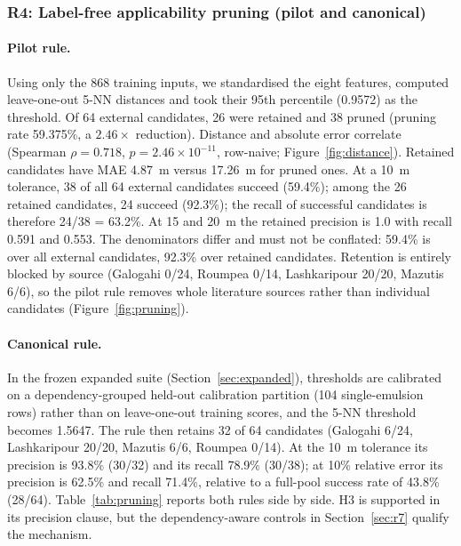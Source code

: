 \documentclass[11pt,a4paper]{article}
\newcommand{\um}{\textmu m}
\begin{document}
\subsubsection{R4: Label-free applicability pruning (pilot and canonical)}
\label{sec:r4}
\paragraph{Pilot rule.} Using only the 868 training inputs, we standardised the
eight features, computed leave-one-out 5-NN distances and took their 95th
percentile (0.9572) as the threshold. Of 64 external candidates, 26 were
retained and 38 pruned (pruning rate 59.375\%, a $2.46\times$ reduction).
Distance and absolute error correlate (Spearman $\rho=0.718$,
$p=2.46\times10^{-11}$, row-naive; Figure~\ref{fig:distance}). Retained
candidates have MAE 4.87~\um{} versus 17.26~\um{} for pruned ones. At a
10~\um{} tolerance, 38 of all 64 external candidates succeed (59.4\%); among
the 26 retained candidates, 24 succeed (92.3\%); the recall of successful
candidates is therefore 24/38 = 63.2\%. At 15 and 20~\um{} the retained
precision is 1.0 with recall 0.591 and 0.553. The denominators differ and
must not be conflated: 59.4\% is over all external candidates, 92.3\% over
retained candidates. Retention is entirely blocked by source (Galogahi 0/24,
Roumpea 0/14, Lashkaripour 20/20, Mazutis 6/6), so the pilot rule removes
whole literature sources rather than individual candidates
(Figure~\ref{fig:pruning}).

\paragraph{Canonical rule.} In the frozen expanded suite
(Section~\ref{sec:expanded}), thresholds are calibrated on a dependency-grouped
held-out calibration partition (104 single-emulsion rows) rather than on
leave-one-out training scores, and the 5-NN threshold becomes 1.5647. The rule
then retains 32 of 64 candidates (Galogahi 6/24, Lashkaripour 20/20, Mazutis
6/6, Roumpea 0/14). At the 10~\um{} tolerance its precision is 93.8\% (30/32)
and its recall 78.9\% (30/38); at 10\% relative error its precision is 62.5\%
and recall 71.4\%, relative to a full-pool success rate of 43.8\% (28/64).
Table~\ref{tab:pruning} reports both rules side by side. H3 is supported in
its precision clause, but the dependency-aware controls in
Section~\ref{sec:r7} qualify the mechanism.
\end{document}
